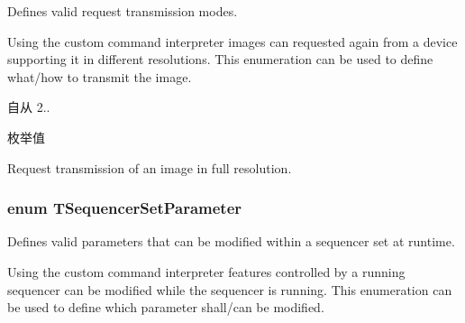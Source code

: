 Defines valid request transmission modes. 

Using the custom command interpreter images can requested again from a device supporting it in different resolutions. This enumeration can be used to define what/how to transmit the image.

\begin{DoxySince}{自从}
2.. 
\end{DoxySince}
\begin{Desc}
\item[枚举值]\par
\begin{description}
\item[{\em 
\hypertarget{group___gen_i_cam_interface_gga5817a4e9c4ac30a320103ae1cec95cb9aa8d28f2764e3f2869ec70d36a2ce2366}{rtm\+Full\+Resolution}\label{group___gen_i_cam_interface_gga5817a4e9c4ac30a320103ae1cec95cb9aa8d28f2764e3f2869ec70d36a2ce2366}
}]Request transmission of an image in full resolution. \end{description}
\end{Desc}
\hypertarget{group___gen_i_cam_interface_ga458c2281fb19ba32fa6a49b02e0a976d}{
\subsubsection[{T\+Sequencer\+Set\+Parameter}]{\setlength{\rightskip}{0pt plus 5cm}enum {\bf T\+Sequencer\+Set\+Parameter}}}\label{group___gen_i_cam_interface_ga458c2281fb19ba32fa6a49b02e0a976d}


Defines valid parameters that can be modified within a sequencer set at runtime. 

Using the custom command interpreter features controlled by a running sequencer can be modified while the sequencer is running. This enumeration can be used to define which parameter shall/can be modified.

